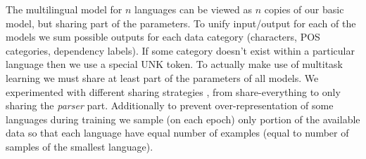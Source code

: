 The multilingual model for $n$ languages can be viewed as $n$ copies of our
basic model, but sharing part of the parameters. To unify input/output for each
of the models we sum possible outputs for each data category (characters,
POS categories, dependency labels). If some category doesn't exist within
a particular language then we use a special UNK token. 
To actually make use of multitask learning we must share at least part of the
parameters of all models. We experimented with different sharing strategies
, from share-everything to only sharing the  \textit{parser} part. Additionally
to prevent over-representation of some
languages during training we sample (on each epoch) only portion of the available
data so that each language have equal number of examples (equal to number of samples
of the smallest language).
